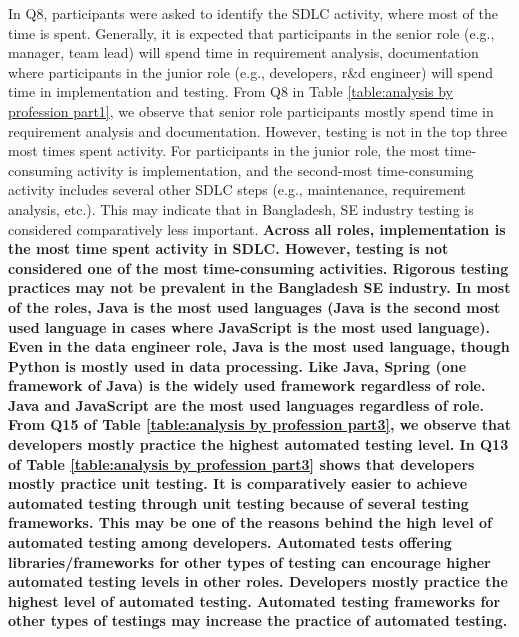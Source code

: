 In Q8, participants were asked to identify the SDLC activity, where most of the time is spent. Generally, it is expected that participants in the senior role (e.g., manager, team lead) will spend time in requirement analysis, documentation where participants in the junior role (e.g., developers, r\&d engineer) will spend time in implementation and testing. From Q8 in Table \ref{table:analysis by profession part1}, we observe that senior role participants mostly spend time in requirement analysis and documentation. However, testing is not in the top three most times spent activity. For participants in the junior role, the most time-consuming activity is implementation, and the second-most time-consuming activity includes several other SDLC steps (e.g., maintenance, requirement analysis, etc.). This may indicate that in Bangladesh, SE industry testing is considered comparatively less important.
\bf{Across all roles, implementation is the most time spent activity in SDLC. However, testing is not considered one of the most time-consuming activities. Rigorous testing practices may not be prevalent in the Bangladesh SE industry.}
In most of the roles, Java is the most used languages (Java is the second most used language in cases where JavaScript is the most used language). Even in the data engineer role, Java is the most used language, though Python is mostly used in data processing. Like Java, Spring (one framework of Java) is the widely used framework regardless of role.
\bf{Java and JavaScript are the most used languages regardless of role.}
From Q15 of Table \ref{table:analysis by profession part3}, we observe that developers mostly practice the highest automated testing level. In Q13 of Table \ref{table:analysis by profession part3} shows that developers mostly practice unit testing. It is comparatively easier to achieve automated testing through unit testing because of several testing frameworks. This may be one of the reasons behind the high level of automated testing among developers. Automated tests offering libraries/frameworks for other types of testing can encourage higher automated testing levels in other roles.
\bf{Developers mostly practice the highest level of automated testing. Automated testing frameworks for other types of testings may increase the practice of automated testing.}